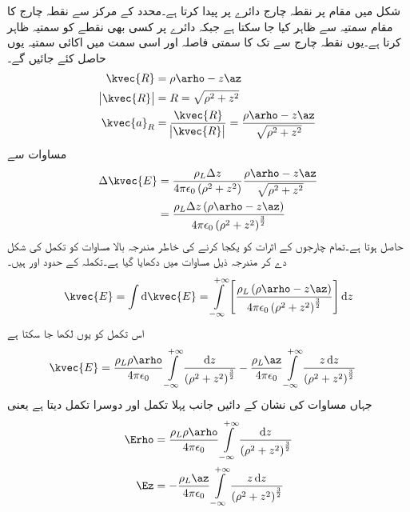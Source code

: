 شکل  میں مقام  پر نقطہ چارج   دائرے پر  پیدا کرتا ہے۔محدد کے مرکز سے نقطہ چارج کا مقام سمتیہ  سے ظاہر کیا جا سکتا ہے جبکہ دائرے پر کسی بھی نقطے  کو سمتیہ  ظاہر کرتا ہے۔یوں نقطہ چارج سے   تک کا سمتی فاصلہ اور اسی سمت میں اکائی سمتیہ یوں حاصل کئے جائیں گے۔
\begin{align*}
\kvec{R}&=\rho \arho-z\az\\
\abs{\kvec{R}}&=R=\sqrt{\rho^2+z^2}\\
\kvec{a}_R&=\frac{\kvec{R}}{\abs{\kvec{R}}}=\frac{\rho \arho-z\az}{\sqrt{\rho^2+z^2}}
\end{align*}
مساوات  سے
\begin{align*}
\Delta \kvec{E}&=\frac{\rho_L \Delta z}{4 \pi \epsilon_0 \left(\rho^2+z^2 \right)} \frac{\rho \arho-z\az}{\sqrt{\rho^2+z^2}}\\
&=\frac{\rho_L \Delta z \left(\rho \arho-z\az \right)}{4 \pi \epsilon_0\left(\rho^2+z^2 \right)^{\frac{3}{2}}}
\end{align*}
حاصل ہوتا ہے۔تمام چارجوں کے اثرات کو یکجا کرنے کی خاطر مندرجہ بالا مساوات کو تکمل کی شکل دے کر مندرجہ ذیل مساوات میں دکھایا گیا ہے۔تکملہ کے حدود  اور   ہیں۔
\begin{align}
\kvec{E}=\int \dif  \kvec{E}=\int\limits_{-\infty}^{+\infty} \left[\frac{\rho_L \left(\rho \arho-z\az \right)}{4 \pi \epsilon_0\left(\rho^2+z^2 \right)^{\frac{3}{2}}}\right] \dif z
\end{align}
اس تکمل کو یوں لکھا جا سکتا ہے
\begin{align}\label{مساوات_کولومب_لامحدود_لکیر_چارج_کا_میدان}
\kvec{E}&=\frac{\rho_L \rho \arho}{4 \pi \epsilon_0}\int\limits_{-\infty}^{+\infty} \frac{\dif z }{\left(\rho^2+z^2 \right)^{\frac{3}{2}}} -\frac{\rho_L \az}{4 \pi \epsilon_0}\int\limits_{-\infty}^{+\infty} \frac{z \dif z}{\left(\rho^2+z^2 \right)^{\frac{3}{2}}}
\end{align}
جہاں مساوات کی نشان کے دائیں جانب پہلا تکمل  \Erho اور دوسرا تکمل \Ez دیتا ہے  یعنی
\begin{gather}
\begin{aligned}\label{مساوات_کولومب_رداسی_اور_عمودی_برقی_میدان}
\Erho&=\frac{\rho_L \rho \arho}{4 \pi \epsilon_0}\int\limits_{-\infty}^{+\infty} \frac{\dif z }{\left(\rho^2+z^2 \right)^{\frac{3}{2}}}\\
\Ez&=-\frac{\rho_L \az}{4 \pi \epsilon_0}\int\limits_{-\infty}^{+\infty} \frac{z \dif z}{\left(\rho^2+z^2 \right)^{\frac{3}{2}}}
\end{aligned}
\end{gather}

